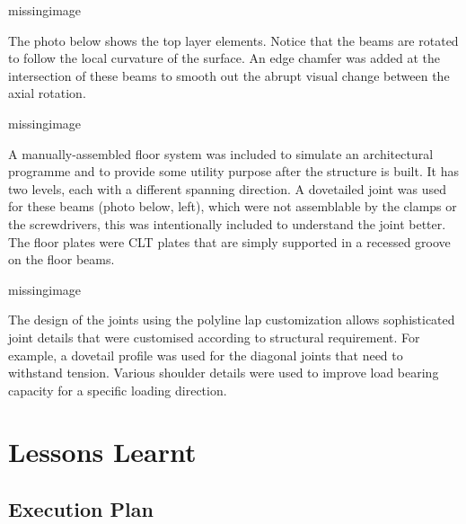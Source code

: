 missingimage

The photo below shows the top layer elements. Notice that the beams are rotated to follow the local curvature of the surface. An edge chamfer was added at the intersection of these beams to smooth out the abrupt visual change between the axial rotation.

missingimage

A manually-assembled floor system was included to simulate an architectural programme and to provide some utility purpose after the structure is built. It has two levels, each with a different spanning direction. A dovetailed joint was used for these beams (photo below, left), which were not assemblable by the clamps or the screwdrivers, this was intentionally included to understand the joint better. The floor plates were CLT plates that are simply supported in a recessed groove on the floor beams.

missingimage

The design of the joints using the polyline lap customization allows sophisticated joint details that were customised according to structural requirement. For example, a dovetail profile was used for the diagonal joints that need to withstand tension. Various shoulder details were used to improve load bearing capacity for a specific loading direction.


\section{Lessons Learnt}
\label{section:exploration_4_lessons_learnt}

\subsection{Execution Plan}
\label{subsection:exploration_4_execution_plan}

